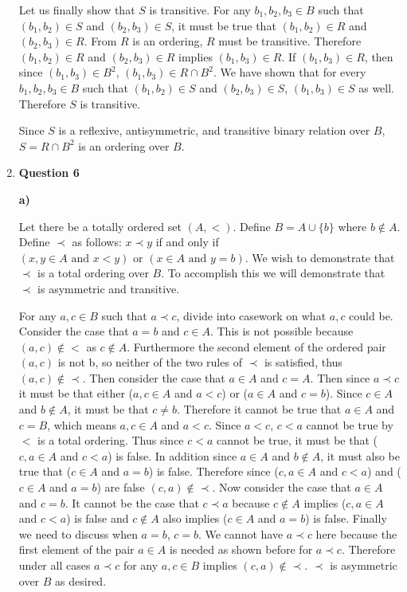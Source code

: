 \documentclass{article}
\begin{document}
\begin{enumerate}
\medskip
Let us finally show that $S$ is transitive. For any $b_1, b_2, b_3 \in B$ such that $(b_1, b_2) \in S$ and $(b_2, b_3) \in S$, it must be true that $(b_1, b_2) \in R$ and $(b_2, b_3) \in R$. From $R$ is an ordering, $R$ must be transitive. Therefore $(b_1, b_2) \in R$ and $(b_2, b_3) \in R$ implies $(b_1, b_3) \in R$. If $(b_1, b_3) \in R$, then since $(b_1, b_3) \in B^{2}$, $(b_1, b_3) \in R \cap B^{2}$. We have shown that for every $b_1, b_2, b_3 \in B$ such that $(b_1, b_2) \in S$ and $(b_2, b_3) \in S$, $(b_1, b_3) \in S$ as well. Therefore $S$ is transitive.

\medskip
Since $S$ is a reflexive, antisymmetric, and transitive binary relation over $B$, $S = R \cap B^{2}$ is an ordering over $B$.

\item \textbf{Question 6}

\medskip 
\textbf{a)} 
\medskip

Let there be a totally ordered set $(A, <)$. Define $B = A \cup \{b\}$ where $b \notin A$. Define $\prec$ as follows: $x \prec y$ if and only if $(x,y \in A \text{ and } x < y) \text { or } (x \in A \text{ and } y = b)$. We wish to demonstrate that $\prec$ is a total ordering over $B$. To accomplish this we will demonstrate that $\prec$ is asymmetric and transitive.

\medskip

For any $a,c \in B$ such that $a \prec c$, divide into casework on what $a,c$ could be. Consider the case that $a = b$ and $c \in A$. This is not possible because $(a,c) \notin <$ as $c \notin A$. Furthermore the second element of the ordered pair $(a,c)$ is not b, so neither of the two rules of $\prec$ is satisfied, thus $(a,c) \notin \prec$. Then consider the case that $a \in A$ and $c = A$. Then since $a \prec c$ it must be that either ($a,c \in A$ and $a < c$) or ($a \in A$ and $c = b$). Since $c \in A$ and $b \notin A$, it must be that $c \neq b$. Therefore it cannot be true that $a \in A$ and $c = B$, which means $a,c \in A$ and $a < c$. Since $a < c$, $c < a$ cannot be true by $<$ is a total ordering. Thus since $c < a$ cannot be true, it must be that ($c,a \in A$ and $c < a$) is false. In addition since $a \in A$ and $b \notin A$, it must also be true that ($c \in A$ and $a = b$) is false. Therefore since ($c,a \in A$ and $c < a$) and ($c \in A$ and $a = b$) are false $(c,a) \notin \prec$. Now consider the case that $a \in A$ and $c = b$. It cannot be the case that $c \prec a$ because $c \notin A$ implies ($c, a \in A$ and $c < a$) is false and $c \notin A$ also implies ($c \in A$ and $a = b$) is false. Finally we need to discuss when $a = b$, $c = b$. We cannot have $a \prec c$ here because the first element of the pair $a \in A$ is needed as shown before for $a \prec c$. Therefore under all cases $a \prec c$ for any $a,c \in B$ implies $(c,a) \notin \prec$. $\prec$ is asymmetric over $B$ as desired.


\end{enumerate}
\end{document}
